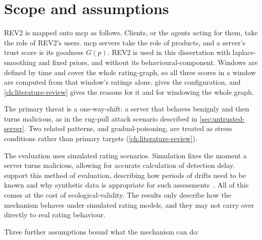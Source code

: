 \section{Scope and assumptions}\label{sec:scope}

REV2 is mapped onto \gls{mcp} as follows. Clients, or the \glspl{agent} acting for them, take the role of REV2's users. \gls{mcp} servers take the role of products, and a server's trust score is its goodness $G(p)$. REV2 is used in this dissertation with \gls{laplace-smoothing} and fixed \glspl{prior}, and without its \gls{behavioural-component}. Windows are defined by time and cover the whole \gls{rating-graph}, so all three scores in a window are computed from that window's ratings alone.  gives the configuration, and \cref{ch:literature-review} gives the reasons for it and for windowing the whole graph.

The primary threat is a \gls{one-way-shift}: a server that behaves benignly and then turns malicious, as in the \gls{rug-pull} attack scenario described in \cref{sec:untrusted-server}. Two related patterns,  and \gls{gradual-poisoning}, are treated as stress conditions rather than primary targets (\cref{ch:literature-review}).

The evaluation uses simulated rating scenarios. Simulation fixes the moment a server turns malicious, allowing for accurate calculation of detection delay. \textcite{Gama2014} support this method of evaluation, describing how periods of drifts need to be known and why synthetic data is appropriate for such assessments~\cite[p.~44:26]{Gama2014}. All of this comes at the cost of \gls{ecological-validity}. The results only describe how the mechanism behaves under simulated rating models, and they may not carry over directly to real rating behaviour.

Three further assumptions bound what the mechanism can do:

